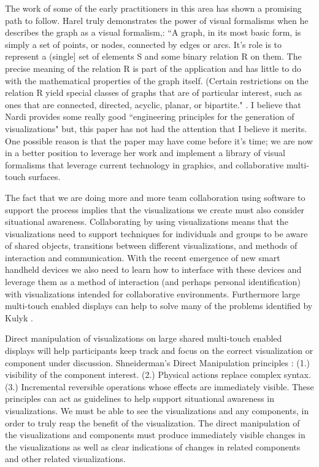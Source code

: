 \documentclass{sig-alternate}
\begin{document}
The work of some of the early practitioners in this area has shown a promising path to follow. Harel truly demonstrates the power of visual formalisms when he describes the graph as a visual formalism,: ``A graph, in its most basic form, is simply a set of
points, or nodes, connected by edges or arcs. It's role is to represent a
(single] set of elements S and some binary relation R on them. The precise
meaning of the relation R is part of the application and has little to do with
the mathematical properties of the graph itself. (Certain restrictions on the
relation R yield special classes of graphs that are of particular interest, such
as ones that are connected, directed, acyclic, planar, or bipartite."
\cite{Harel:1988:VisualFormalisms}. I believe that Nardi provides some really
good ``engineering principles for the generation of visualizations"
\cite{Nardi:BeyondModels} but, this paper has not had the attention that I
believe it merits. One possible reason is that the paper may have come before it's time; we are now in a better position to leverage her work and implement a library of visual formalisms that leverage
current technology in graphics, and collaborative multi-touch surfaces.

The fact
that we are doing more and more team collaboration using software to support the
process implies that the visualizations we create must also
consider situational awareness. Collaborating by using visualizations means that
the visualizations need to support techniques for individuals and groups to be
aware of shared objects, transitions between different visualizations,
and methods of interaction and communication. With the recent emergence of new smart
handheld devices we also need to learn how to interface with these devices and
leverage them as a method of interaction (and perhaps personal identification)
with visualizations intended for collaborative environments. Furthermore large
multi-touch enabled displays can help to solve many of the problems identified
by Kulyk \cite{Kulyk:2008:SituationalAwareness}.

Direct manipulation of visualizations on large shared multi-touch enabled displays will help participants keep track and focus on the
correct visualization or component under discussion. Shneiderman's Direct
Manipulation principles \cite{Shneiderman:1997:DirectManipulation}: (1.)  visibility of the component interest.
(2.) Physical actions replace complex syntax. (3.) Incremental reversible
operations whose effects are immediately visible. These principles can act as
guidelines to help support situational awareness in visualizations. We must be
able to see the visualizations and any components, in order to truly reap the
benefit of the visualization. The direct manipulation of the visualizations and
components must produce immediately visible changes in the visualizations as
well as clear indications of changes in related components and other related
visualizations.
\end{document}
